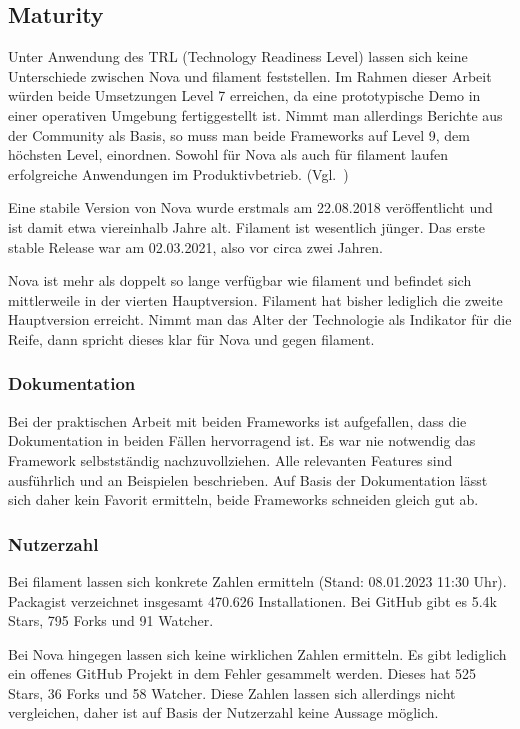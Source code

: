 \subsection{Maturity}
Unter Anwendung des TRL (Technology Readiness Level) lassen sich keine Unterschiede zwischen Nova und filament feststellen.
Im Rahmen dieser Arbeit würden beide Umsetzungen Level 7 erreichen, da eine prototypische Demo in einer operativen Umgebung fertiggestellt ist.
Nimmt man allerdings Berichte aus der Community als Basis, so muss man beide Frameworks auf Level 9, dem höchsten Level, einordnen.
Sowohl für Nova als auch für filament laufen erfolgreiche Anwendungen im Produktivbetrieb.
(Vgl.~\cite{technology-readiness})

Eine stabile Version von Nova wurde erstmals am 22.08.2018\cite{nova-releases} veröffentlicht und ist damit etwa viereinhalb Jahre alt.
Filament ist wesentlich jünger.
Das erste stable Release war am 02.03.2021\cite{filament-releases}, also vor circa zwei Jahren.

Nova ist mehr als doppelt so lange verfügbar wie filament und befindet sich mittlerweile in der vierten Hauptversion\cite{nova-releases}.
Filament hat bisher lediglich die zweite Hauptversion\cite{filament-releases} erreicht.
Nimmt man das Alter der Technologie als Indikator für die Reife, dann spricht dieses klar für Nova und gegen filament.

\subsubsection{Dokumentation}
Bei der praktischen Arbeit mit beiden Frameworks ist aufgefallen, dass die Dokumentation in beiden Fällen hervorragend ist.
Es war nie notwendig das Framework selbstständig nachzuvollziehen.
Alle relevanten Features sind ausführlich und an Beispielen beschrieben.
Auf Basis der Dokumentation lässt sich daher kein Favorit ermitteln, beide Frameworks schneiden gleich gut ab.

\subsubsection{Nutzerzahl}
Bei filament lassen sich konkrete Zahlen ermitteln (Stand: 08.01.2023 11:30 Uhr).
Packagist verzeichnet insgesamt 470.626 Installationen.
Bei GitHub gibt es 5.4k Stars, 795 Forks und 91 Watcher.

Bei Nova hingegen lassen sich keine wirklichen Zahlen ermitteln.
Es gibt lediglich ein offenes GitHub Projekt in dem Fehler gesammelt werden.
Dieses hat 525 Stars, 36 Forks und 58 Watcher.
Diese Zahlen lassen sich allerdings nicht vergleichen, daher ist auf Basis der Nutzerzahl keine Aussage möglich.

